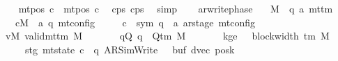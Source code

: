 \begin{isabellebody}
\ \ \ \ \isamarkupfalse%
\ {\isachardoublequoteopen}mt{\isacharunderscore}{\kern0pt}pos\ c{}\ {\isacharequal}{\kern0pt}\ mt{\isacharunderscore}{\kern0pt}pos\ c{}{\isachardoublequoteclose}\ \isamarkupfalse%
\ c{}{\isacharunderscore}{\kern0pt}ps\ c{}{\isacharunderscore}{\kern0pt}ps\ \isamarkupfalse%
\ simp\isanewline
\ \ \isamarkupfalse%
\isanewline
{}\isamarkupfalse%
%
\endisatagproof
{\isafoldproof}%
%
\isadelimproof
\isanewline
%
\endisadelimproof
\isanewline
{}\isamarkupfalse%
\ ar{\isacharunderscore}{\kern0pt}write{\isacharunderscore}{\kern0pt}phase{\isacharcolon}{\kern0pt}\isanewline
\ \ \ M\ {\isacharcolon}{\kern0pt}{\isacharcolon}{\kern0pt}\ {\isachardoublequoteopen}{\isacharparenleft}{\kern0pt}{\isacharprime}{\kern0pt}q{\isacharcomma}{\kern0pt}\ {\isacharprime}{\kern0pt}a{\isacharparenright}{\kern0pt}\ mttm{\isachardoublequoteclose}\isanewline
\ \ \ \ \ cM\ {\isacharcolon}{\kern0pt}{\isacharcolon}{\kern0pt}\ {\isachardoublequoteopen}{\isacharparenleft}{\kern0pt}{\isacharprime}{\kern0pt}a{\isacharcomma}{\kern0pt}\ {\isacharprime}{\kern0pt}q{\isacharparenright}{\kern0pt}\ mt{\isacharunderscore}{\kern0pt}config{\isachardoublequoteclose}\isanewline
\ \ \ \ \ c{}\ {\isacharcolon}{\kern0pt}{\isacharcolon}{\kern0pt}\ {\isachardoublequoteopen}{\isacharparenleft}{\kern0pt}sym{}{\isacharcomma}{\kern0pt}\ {\isacharprime}{\kern0pt}q\ {\isasymtimes}\ {\isacharprime}{\kern0pt}a\ ar{\isacharunderscore}{\kern0pt}stage{\isacharparenright}{\kern0pt}\ mt{\isacharunderscore}{\kern0pt}config{\isachardoublequoteclose}\isanewline
\ \ \ vM{\isacharcolon}{\kern0pt}\ {\isachardoublequoteopen}valid{\isacharunderscore}{\kern0pt}mttm\ M{\isachardoublequoteclose}\isanewline
\ \ \ \ \ \ \ qQ{\isacharcolon}{\kern0pt}\ {\isachardoublequoteopen}q\ {\isasymin}\ Q{\isacharunderscore}{\kern0pt}tm\ M{\isachardoublequoteclose}\isanewline
\ \ \ \ \ \ \ kge{}{\isacharcolon}{\kern0pt}\ {\isachardoublequoteopen}{}\ {\isasymle}\ block{\isacharunderscore}{\kern0pt}width\ {\isacharparenleft}{\kern0pt}{\isasymGamma}{\isacharunderscore}{\kern0pt}tm\ M{\isacharparenright}{\kern0pt}{\isachardoublequoteclose}\isanewline
\ \ \ \ \ \ \ stg{}{\isacharcolon}{\kern0pt}\ {\isachardoublequoteopen}mt{\isacharunderscore}{\kern0pt}state\ c{}\ {\isacharequal}{\kern0pt}\ {\isacharparenleft}{\kern0pt}q{\isacharcomma}{\kern0pt}\ AR{\isacharunderscore}{\kern0pt}SimWrite{\isacharcomma}{\kern0pt}\ {}{\isacharcomma}{\kern0pt}\ {}{\isacharcomma}{\kern0pt}\ buf{\isacharcomma}{\kern0pt}\ dvec{\isacharcomma}{\kern0pt}\ posk{\isacharparenright}{\kern0pt}{\isachardoublequoteclose}\isanewline

\end{isabellebody}
